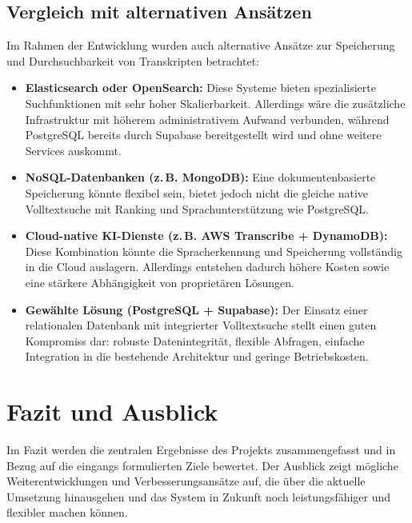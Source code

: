 \subsection{Vergleich mit alternativen Ansätzen}
\label{sec:alternativen}
Im Rahmen der Entwicklung wurden auch alternative Ansätze zur Speicherung und Durchsuchbarkeit von Transkripten betrachtet:
\begin{itemize}
        \item \textbf{Elasticsearch oder OpenSearch:}
        Diese Systeme bieten spezialisierte Suchfunktionen mit sehr hoher Skalierbarkeit.
        Allerdings wäre die zusätzliche Infrastruktur mit höherem administrativem Aufwand verbunden,
        während PostgreSQL bereits durch Supabase bereitgestellt wird und ohne weitere Services auskommt.

        \item \textbf{NoSQL-Datenbanken (z.\,B. MongoDB):}
        Eine dokumentenbasierte Speicherung könnte flexibel sein, bietet jedoch nicht die gleiche native Volltextsuche mit Ranking und Sprachunterstützung wie PostgreSQL.

        \item \textbf{Cloud-native \ac{KI}-Dienste (z.\,B. \ac{AWS} Transcribe + DynamoDB):}
        Diese Kombination könnte die Spracherkennung und Speicherung vollständig in die Cloud auslagern.
        Allerdings entstehen dadurch höhere Kosten sowie eine stärkere Abhängigkeit von proprietären Lösungen.

        \item \textbf{Gewählte Lösung (PostgreSQL + Supabase):}
        Der Einsatz einer relationalen Datenbank mit integrierter Volltextsuche stellt einen guten Kompromiss dar:
        robuste Datenintegrität, flexible Abfragen, einfache Integration in die bestehende Architektur und geringe Betriebskosten.
    \end{itemize}


\section{Fazit und Ausblick}
Im Fazit werden die zentralen Ergebnisse des Projekts zusammengefasst und in
Bezug auf die eingangs formulierten Ziele bewertet. Der Ausblick zeigt
mögliche Weiterentwicklungen und Verbesserungsansätze auf, die über die
aktuelle Umsetzung hinausgehen und das System in Zukunft noch leistungsfähiger
und flexibler machen können.

